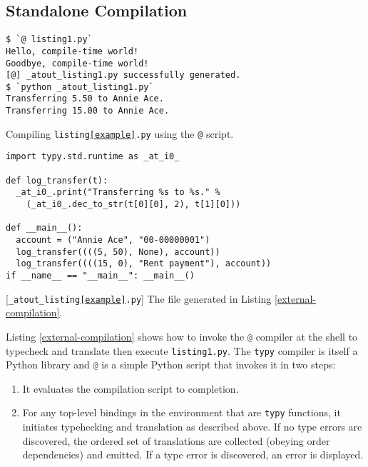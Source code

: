 \documentclass[preprint,10pt]{sigplanconf}
\newcommand{\lip}[1]{\lstinline[language=Python,basicstyle=\ttfamily\small,deletendkeywords={tuple,buffer,map}]{#1}}
\begin{document}
\subsection{Standalone Compilation}\label{compilation} 
\begin{codelisting}[t]
\begin{lstlisting}[style=Bash]
$ `@ listing1.py`
Hello, compile-time world!
Goodbye, compile-time world!
[@] _atout_listing1.py successfully generated.
$ `python _atout_listing1.py`
Transferring 5.50 to Annie Ace.
Transferring 15.00 to Annie Ace.
\end{lstlisting}
\caption{Compiling \texttt{listing\ref{example}.py} using the \texttt{@} script.}
\label{external-compilation}
\end{codelisting}
\begin{codelisting}[t]
\begin{lstlisting}
import typy.std.runtime as _at_i0_

def log_transfer(t):
  _at_i0_.print("Transferring %s to %s." % 
    (_at_i0_.dec_to_str(t[0][0], 2), t[1][0]))

def __main__():
  account = ("Annie Ace", "00-00000001")
  log_transfer((((5, 50), None), account))
  log_transfer((((15, 0), "Rent payment"), account))
if __name__ == "__main__": __main__()
\end{lstlisting}
\caption{[\texttt{\_atout\_listing\ref{example}.py}] The file generated in Listing \ref{external-compilation}.}
\label{example-out}
\end{codelisting}


Listing \ref{external-compilation} shows how to invoke the \lip{@} compiler at the shell to typecheck and translate then execute \lip{listing1.py}. %
The \texttt{typy} compiler is itself a Python library and \lip{@} is a simple Python script that invokes it in two steps:
\begin{enumerate}
\item It evaluates the compilation script to completion.
\item For any top-level bindings in the environment that are \texttt{typy} functions, it initiates typehecking and translation as described above. If no type errors are discovered, the ordered set of translations are collected (obeying order dependencies) and emitted. If a type error is discovered, an error is displayed.
\end{enumerate}
\end{document}
